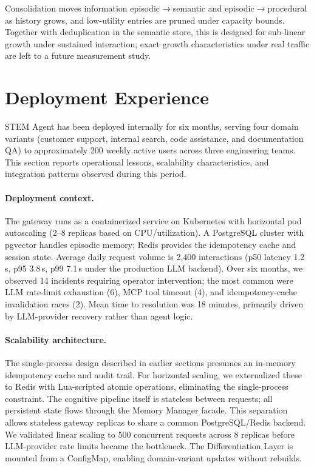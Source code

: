 \documentclass[11pt]{article}
\begin{document}
Consolidation moves information episodic$\to$semantic and episodic$\to$procedural as history grows, and low-utility entries are pruned under capacity bounds. Together with deduplication in the semantic store, this is designed for sub-linear growth under sustained interaction; exact growth characteristics under real traffic are left to a future measurement study.

\section{Deployment Experience}
\label{sec:deployment}

STEM Agent has been deployed internally for six months, serving four domain variants (customer support, internal search, code assistance, and documentation QA) to approximately 200 weekly active users across three engineering teams. This section reports operational lessons, scalability characteristics, and integration patterns observed during this period.

\paragraph{Deployment context.} The gateway runs as a containerized service on Kubernetes with horizontal pod autoscaling (2--8 replicas based on CPU/utilization). A PostgreSQL cluster with pgvector handles episodic memory; Redis provides the idempotency cache and session state. Average daily request volume is 2,400 interactions (p50 latency 1.2\,s, p95 3.8\,s, p99 7.1\,s under the production LLM backend). Over six months, we observed 14 incidents requiring operator intervention; the most common were LLM rate-limit exhaustion (6), MCP tool timeout (4), and idempotency-cache invalidation races (2). Mean time to resolution was 18 minutes, primarily driven by LLM-provider recovery rather than agent logic.

\paragraph{Scalability architecture.} The single-process design described in earlier sections presumes an in-memory idempotency cache and audit trail. For horizontal scaling, we externalized these to Redis with Lua-scripted atomic operations, eliminating the single-process constraint. The cognitive pipeline itself is stateless between requests; all persistent state flows through the Memory Manager facade. This separation allows stateless gateway replicas to share a common PostgreSQL/Redis backend. We validated linear scaling to 500 concurrent requests across 8 replicas before LLM-provider rate limits became the bottleneck. The Differentiation Layer is mounted from a ConfigMap, enabling domain-variant updates without rebuilds.
\end{document}
